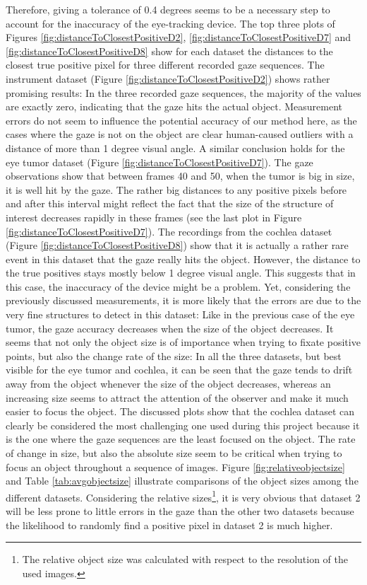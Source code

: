 Therefore, giving a tolerance of 0.4 degrees seems to be a necessary step to account for the inaccuracy of the eye-tracking device. The top three plots of Figures \ref{fig:distanceToClosestPositiveD2}, \ref{fig:distanceToClosestPositiveD7} and \ref{fig:distanceToClosestPositiveD8} show for each dataset the distances to the closest true positive pixel for three different recorded gaze sequences. 
The instrument dataset (Figure \ref{fig:distanceToClosestPositiveD2}) shows rather promising results: 
In the three recorded gaze sequences, the majority of the values are exactly zero, indicating that the gaze hits the actual object. 
Measurement errors do not seem to influence the potential accuracy of our method here, as the cases where the gaze is not on the object are clear human-caused outliers with a distance of more than 1 degree visual angle.
A similar conclusion holds for the eye tumor dataset (Figure \ref{fig:distanceToClosestPositiveD7}). 
The gaze observations show that between frames 40 and 50, when the tumor is big in size, it is well hit by the gaze. 
The rather big distances to any positive pixels before and after this interval might reflect the fact that the size of the structure of interest decreases rapidly in these frames (see the last plot in Figure \ref{fig:distanceToClosestPositiveD7}). 
The recordings from the cochlea dataset (Figure \ref{fig:distanceToClosestPositiveD8}) show that it is actually a rather rare event in this dataset that the gaze really hits the object. However, the distance to the true positives stays mostly below 1 degree visual angle. This suggests that in this case, the inaccuracy of the device might be a problem.
Yet, considering the previously discussed measurements, it is more likely that the errors are due to the very fine structures to detect in this dataset: Like in the previous case of the eye tumor, the gaze accuracy decreases when the size of the object decreases. 
It seems that not only the object size is of importance when trying to fixate positive points, but also the change rate of the size: In all the three datasets, but best visible for the eye tumor and cochlea, it can be seen that the gaze tends to drift away from the object whenever the size of the object decreases, whereas an increasing size seems to attract the attention of the observer and make it much easier to focus the object. 
The discussed plots show that the cochlea dataset can clearly be considered the most challenging one used during this project because it is the one where the gaze sequences are the least focused on the object. 
The rate of change in size, but also the absolute size seem to be critical when trying to focus an object throughout a sequence of images. Figure \ref{fig:relativeobjectsize} and Table \ref{tab:avgobjectsize} illustrate comparisons of the object sizes among the different datasets. Considering the relative sizes\footnote{The relative object size was calculated with respect to the resolution of the used images.}, it is very obvious that dataset 2 will be less prone to little errors in the gaze than the other two datasets because the likelihood to randomly find a positive pixel in dataset 2 is much higher.

